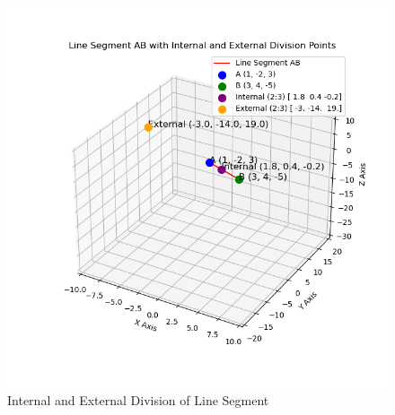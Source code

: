 \documentclass[journal]{IEEEtran}
\begin{document}
\begin{figure}[h!]
   \centering
   \includegraphics[width=0.7\linewidth]{figs/line_division.png}
   \caption{Internal and External Division of Line Segment}
\end{figure}
\end{document}
